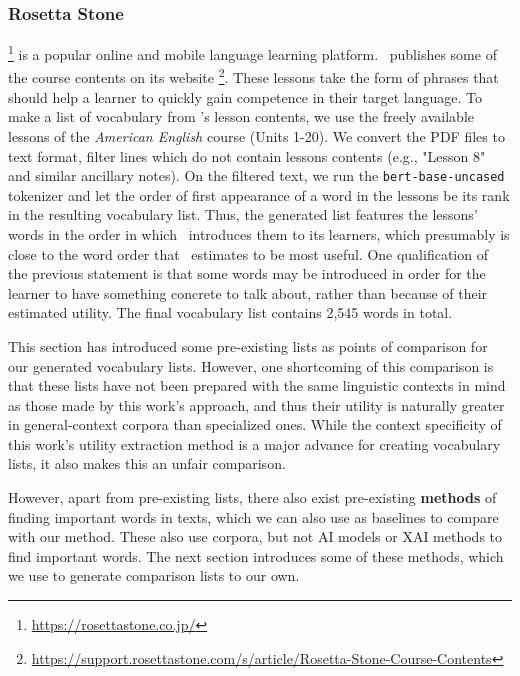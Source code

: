 \subsubsection{Rosetta Stone}
\Rosetta \footnote{\url{https://rosettastone.co.jp/}} is a popular online and mobile language learning platform.
\Rosetta\ publishes some of the course contents on its website \footnote{\url{https://support.rosettastone.com/s/article/Rosetta-Stone-Course-Contents}}.
These lessons take the form of phrases that should help a learner to quickly gain competence in their target language.
To make a list of vocabulary from \Rosetta 's lesson contents, we use the freely available lessons  of the \textit{American English} course (Units 1-20).
We convert the PDF files to text format, filter lines which do not contain lessons contents (e.g., "Lesson 8" and similar ancillary notes).
On the filtered text, we run the \texttt{bert-base-uncased} tokenizer and let the order of first appearance of a word in the lessons be its rank in the resulting vocabulary list.
Thus, the generated list features the lessons' words in the order in which \Rosetta\ introduces them to its learners, which presumably is close to the word order that \Rosetta\ estimates to be most useful.
One qualification of the previous statement is that some words may be introduced in order for the learner to have something concrete to talk about, rather than because of their estimated utility.
The final vocabulary list contains 2,545 words in total.

This section has introduced some pre-existing lists as points of comparison for our generated vocabulary lists.
However, one shortcoming of this comparison is that these lists have not been prepared with the same linguistic contexts in mind as those made by this work's approach, and thus their utility is naturally greater in general-context corpora than specialized ones.
While the context specificity of this work's utility extraction method is a major advance for creating vocabulary lists, it also makes this an unfair comparison.

However, apart from pre-existing lists, there also exist pre-existing \textbf{methods} of finding important words in texts, which we can also use as baselines to compare with our method.
These also use corpora, but not AI models or XAI methods to find important words.
The next section introduces some of these methods, which we use to generate comparison lists to our own.


